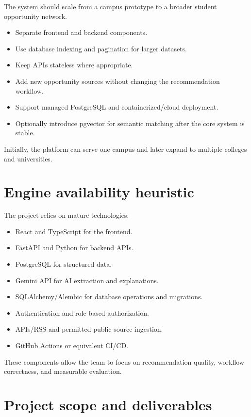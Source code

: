 \documentclass[11pt,a4paper]{article}
\begin{document}
The system should scale from a campus prototype to a broader student opportunity network.

\begin{itemize}
\item Separate frontend and backend components.
\item Use database indexing and pagination for larger datasets.
\item Keep APIs stateless where appropriate.
\item Add new opportunity sources without changing the recommendation workflow.
\item Support managed PostgreSQL and containerized/cloud deployment.
\item Optionally introduce pgvector for semantic matching after the core system is stable.
\end{itemize}

Initially, the platform can serve one campus and later expand to multiple colleges and universities.

\section{Engine availability heuristic}

The project relies on mature technologies:

\begin{itemize}
\item React and TypeScript for the frontend.
\item FastAPI and Python for backend APIs.
\item PostgreSQL for structured data.
\item Gemini API for AI extraction and explanations.
\item SQLAlchemy/Alembic for database operations and migrations.
\item Authentication and role-based authorization.
\item APIs/RSS and permitted public-source ingestion.
\item GitHub Actions or equivalent CI/CD.
\end{itemize}

These components allow the team to focus on recommendation quality, workflow correctness, and measurable evaluation.

\section{Project scope and deliverables}
\end{document}
